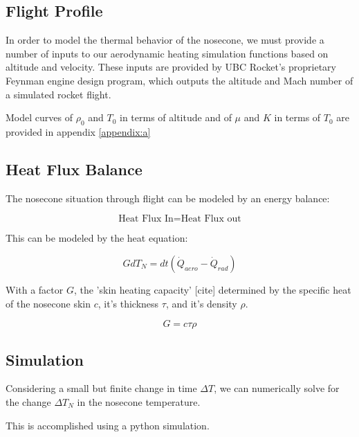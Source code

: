 \documentclass[twocolumn]{article}
\begin{document}

        \subsection{Flight Profile}
            In order to model the thermal behavior of the nosecone, we must
            provide a number of inputs to our aerodynamic heating simulation 
            functions based on altitude and velocity. These inputs are provided 
            by UBC Rocket's proprietary Feynman engine design program, which 
            outputs the altitude and Mach number of a simulated rocket flight.

            Model curves of $\rho_0$ and  $T_0$ in terms of altitude and of 
            $\mu$ and $K$ in terms of $T_0$ are provided in appendix \ref{appendix:a}
        \subsection{Heat Flux Balance}
            The nosecone situation through flight can be modeled by an energy 
            balance:

            \[\textrm{Heat Flux In} = \textrm{Heat Flux out}\]

            This can be modeled by the heat equation:

            \[G dT_N = dt(\dot{Q}_{aero}-\dot{Q}_{rad})\]

            With a factor $G$, the 'skin heating capacity' [cite] %
            determined by the specific heat of the nosecone skin $c$, it's 
            thickness $\tau$, and it's density $\rho$.

            \[G=c\tau\rho\]

        \subsection{Simulation}

            Considering a small but finite change in time $\Delta T$, we can
            numerically solve for the change $\Delta T_N$ in the nosecone
            temperature.

            This is accomplished using a python simulation.
\end{document}
